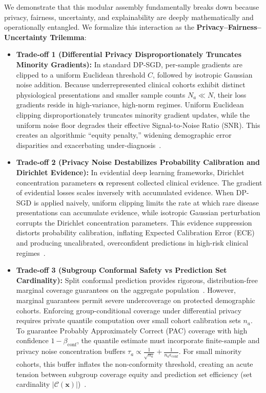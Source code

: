 \documentclass[3p,12pt]{elsarticle}
\theoremstyle{plain}
\theoremstyle{definition}
\begin{document}
We demonstrate that this modular assembly fundamentally breaks down because privacy, fairness, uncertainty, and explainability are deeply mathematically and operationally entangled. We formalize this interaction as the \textbf{Privacy--Fairness--Uncertainty Trilemma}:
\begin{itemize}
    \item \textbf{Trade-off 1 (Differential Privacy Disproportionately Truncates Minority Gradients):} In standard DP-SGD, per-sample gradients are clipped to a uniform Euclidean threshold $C$, followed by isotropic Gaussian noise addition. Because underrepresented clinical cohorts exhibit distinct physiological presentations and smaller sample counts $N_a \ll N$, their loss gradients reside in high-variance, high-norm regimes. Uniform Euclidean clipping disproportionately truncates minority gradient updates, while the uniform noise floor degrades their effective Signal-to-Noise Ratio (SNR). This creates an algorithmic ``equity penalty,'' widening demographic error disparities and exacerbating under-diagnosis~\cite{bagdasaryan2019differential,suriyakumar2021chasing,xu2021removing,tran2021differentially}.
    \item \textbf{Trade-off 2 (Privacy Noise Destabilizes Probability Calibration and Dirichlet Evidence):} In evidential deep learning frameworks, Dirichlet concentration parameters $\boldsymbol{\alpha}$ represent collected clinical evidence. The gradient of evidential losses scales inversely with accumulated evidence. When DP-SGD is applied naively, uniform clipping limits the rate at which rare disease presentations can accumulate evidence, while isotropic Gaussian perturbation corrupts the Dirichlet concentration parameters. This evidence suppression distorts probability calibration, inflating Expected Calibration Error (ECE) and producing uncalibrated, overconfident predictions in high-risk clinical regimes~\cite{farrand2020neither,sensoy2018evidential}.
    \item \textbf{Trade-off 3 (Subgroup Conformal Safety vs Prediction Set Cardinality):} Split conformal prediction provides rigorous, distribution-free marginal coverage guarantees on the aggregate population~\cite{vovk2005algorithmic,angelopoulos2021gentle,tibshirani2019conformal}. However, marginal guarantees permit severe undercoverage on protected demographic cohorts. Enforcing group-conditional coverage under differential privacy requires private quantile computation over small cohort calibration sets $n_a$. To guarantee Probably Approximately Correct (PAC) coverage with high confidence $1-\beta_{\text{conf}}$, the quantile estimate must incorporate finite-sample and privacy noise concentration buffers $\tau_a \propto \frac{1}{\sqrt{n_a}} + \frac{1}{n_a \epsilon_{\text{conf}}}$. For small minority cohorts, this buffer inflates the non-conformity threshold, creating an acute tension between subgroup coverage equity and prediction set efficiency (set cardinality $|\mathcal{C}(\mathbf{x})|$)~\cite{angelopoulos2021private}.
\end{itemize}
\end{document}
